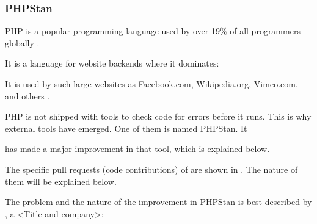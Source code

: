 \subsubsection{PHPStan}
\label{subsubsec:ContributionsPhpStan}


PHP is a popular programming language used by over 19\% of all programmers globally .

It is a language for website backends where it dominates:


It is used by such large websites as Facebook.com, Wikipedia.org, Vimeo.com, and others .

PHP is not shipped with tools to check code for errors before it runs.
This is why external tools have emerged.
One of them is named PHPStan.
It


\mrl has made a major improvement in that tool, which is explained below.



The specific pull requests (code contributions) of \mrl are shown in .
The nature of them will be explained below.



The problem and the nature of the \mrls improvement in PHPStan is best described
by \MrPhpOne, a <Title and company>:

